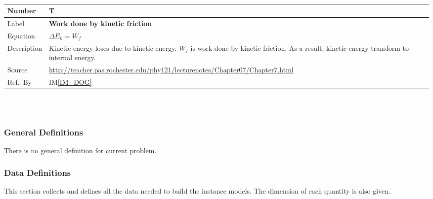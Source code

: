 \documentclass[12pt]{article}
\newcommand{\colAwidth}{0.13\textwidth}
\newcommand{\colBwidth}{0.82\textwidth}
\newcounter{theorynum} %
\newcommand{\iref}[1]{IM\ref{#1}}
\begin{document}
~\newline

\noindent
\begin{minipage}{\textwidth}
	\renewcommand*{\arraystretch}{1.5}
	\begin{tabular}{| p{\colAwidth} | p{\colBwidth}|}
		\hline
		\rowcolor[gray]{0.9}
		Number& T{theorynum}\thetheorynum \label{T_WKF}\\
		\hline
		Label&\bf Work done by kinetic friction\\
		\hline
		Equation&  $\Delta E_{k}=W_{f}$\\
		\hline
		
		Description & 
		Kinetic energy loses due to kinetic energy. $W_{f}$ is work done by kinetic friction. As a result, kinetic energy transform to internal energy.\\
		\hline
		Source &
		\url{http://teacher.pas.rochester.edu/phy121/lecturenotes/Chapter07/Chapter7.html}\\
		\hline
		Ref.\ By & \iref{IM_DOG}\\
		\hline
	\end{tabular}
\end{minipage}\\

~\newline

\subsubsection{General Definitions}\label{sec_gendef}

There is no general definition for current problem.

\subsubsection{Data Definitions}\label{sec_datadef}

This section collects and defines all the data needed to build the instance
models. The dimension of each quantity is also given. 

~\newline
\end{document}
